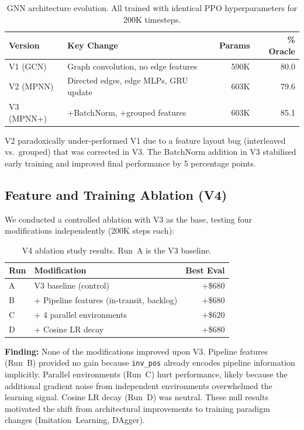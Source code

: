 \begin{table}[htbp]
\centering
\caption{GNN architecture evolution. All trained with identical PPO
hyperparameters for 200K timesteps.}
\label{tab:gnn_versions}
\small
\begin{tabular}{llrr}
\toprule
\textbf{Version} & \textbf{Key Change} & \textbf{Params} & \textbf{\% Oracle} \\
\midrule
V1 (GCN) & Graph convolution, no edge features & 590K & 80.0 \\
V2 (MPNN) & Directed edges, edge MLPs, GRU update & 603K & 79.6 \\
V3 (MPNN+) & +BatchNorm, +grouped features & 603K & 85.1 \\
\bottomrule
\end{tabular}
\end{table}

V2 paradoxically under-performed V1 due to a feature layout bug
(interleaved vs.\ grouped) that was corrected in V3. The BatchNorm
addition in V3 stabilised early training and improved final
performance by 5 percentage points.

\subsection{Feature and Training Ablation (V4)}

We conducted a controlled ablation with V3 as the base, testing
four modifications independently (200K steps each):

\begin{table}[htbp]
\centering
\caption{V4 ablation study results. Run~A is the V3 baseline.}
\label{tab:v4_ablation}
\small
\begin{tabular}{llr}
\toprule
\textbf{Run} & \textbf{Modification} & \textbf{Best Eval} \\
\midrule
A & V3 baseline (control) & $+$\$680 \\
B & + Pipeline features (in-transit, backlog) & $+$\$680 \\
C & + 4 parallel environments & $+$\$620 \\
D & + Cosine LR decay & $+$\$680 \\
\bottomrule
\end{tabular}
\end{table}

\noindent\textbf{Finding:} None of the modifications improved upon V3.
Pipeline features (Run~B) provided no gain because \texttt{inv\_pos}
already encodes pipeline information implicitly. Parallel environments
(Run~C) hurt performance, likely because the additional gradient noise
from independent environments overwhelmed the learning signal. Cosine LR
decay (Run~D) was neutral. These null results motivated the shift from
architectural improvements to training paradigm changes
(Imitation~Learning, DAgger).

